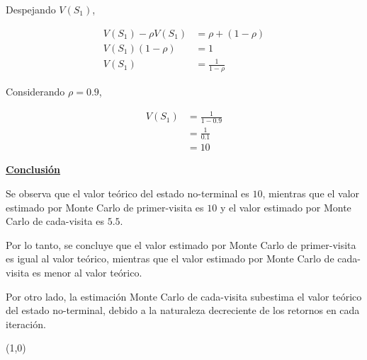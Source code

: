 Despejando $V(S_1)$,

\begin{align*}
    V(S_1) - \rho V(S_1) &= \rho + \left(1 - \rho\right) \\
    V(S_1) \left(1 - \rho\right) &= 1 \\
    V(S_1) &= \frac{1}{1 - \rho}
\end{align*}

Considerando $\rho = 0.9$,

\begin{align*}
    V(S_1) &= \frac{1}{1 - 0.9} \\
    &= \frac{1}{0.1} \\
    &= 10
\end{align*}

\indent\underline{\textbf{Conclusión}\\}

Se observa que el valor teórico del estado no-terminal es $10$, mientras que el valor estimado por Monte Carlo de primer-visita es $10$ y el valor estimado por Monte Carlo de cada-visita es $5.5$.

Por lo tanto, se concluye que el valor estimado por Monte Carlo de primer-visita es igual al valor teórico, mientras que el valor estimado por Monte Carlo de cada-visita es menor al valor teórico.

Por otro lado, la estimación Monte Carlo de cada-visita subestima el valor teórico del estado no-terminal, debido a la naturaleza decreciente de los retornos en cada iteración.

\line(1,0){\textwidth}

